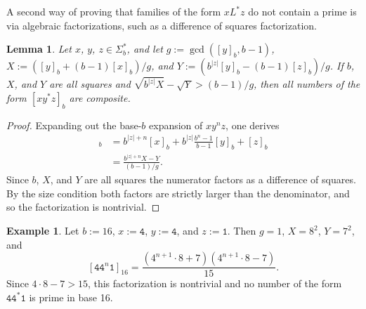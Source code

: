 \documentclass[12pt]{article}
\theoremstyle{plain}
\newtheorem{lemma}[theorem]{Lemma}
\theoremstyle{definition}
\newtheorem{example}[theorem]{Example}
\theoremstyle{remark}
\newcommand{\0}{\mathtt{0}}
\newcommand{\1}{\mathtt{1}}
\newcommand{\2}{\mathtt{2}}
\newcommand{\3}{\mathtt{3}}
\newcommand{\4}{\mathtt{4}}
\newcommand{\5}{\mathtt{5}}
\newcommand{\6}{\mathtt{6}}
\newcommand{\7}{\mathtt{7}}
\newcommand{\8}{\mathtt{8}}
\newcommand{\9}{\mathtt{9}}
\begin{document}
A second way of proving that families of the form $xL^*z$ do not contain a 
prime is via algebraic factorizations, such as a difference of squares 
factorization.

\begin{lemma}\label{lemsquares}
Let $x$, $y$, $z\in\Sigma^*_b$, and let $g:=\gcd([y]_b,b-1)$, 
$X:=([y]_b+(b-1)[x]_b)/g$, and $Y:=(b^{\lvert{z}\rvert}[y]_b-(b-1)[z]_b)/g$.
If\/ $b$, $X$, and $Y$ are all squares and 
$\sqrt{b^{\lvert z\rvert}X}-\sqrt{Y}>(b-1)/g$, then all numbers of the form
 $[xy^*z]_b$ are composite.
\end{lemma}
\begin{proof}
Expanding out the base-$b$ expansion of $xy^nz$, one derives
\begin{align*}
[xy^nz]_b &= b^{\lvert z\rvert+n}[x]_b + b^{\lvert z\rvert}\frac{b^n-1}{b-1}[y]_b + [z]_b \\
&= \frac{b^{\lvert z\rvert+n}X-Y}{(b-1)/g} . 
\end{align*}
Since $b$, $X$, and $Y$ are all squares the numerator factors as a 
difference of squares.  By the size condition both factors are 
strictly larger than the
denominator, and so the factorization is nontrivial.
\end{proof}

\begin{example}
Let $b:=16$, $x:=\4$, $y:=\4$, and $z:=\1$.  Then $g=1$, $X=8^2$, $Y=7^2$, and
\[ [\4\4^n\1]_{16} = \frac{(4^{n+1}\cdot8+7)(4^{n+1}\cdot8-7)}{15} . \]
Since $4\cdot8-7>15$, this factorization is nontrivial and no number of 
the form $\4\4^*\1$ is prime in base 16.
\end{example}
\end{document}
